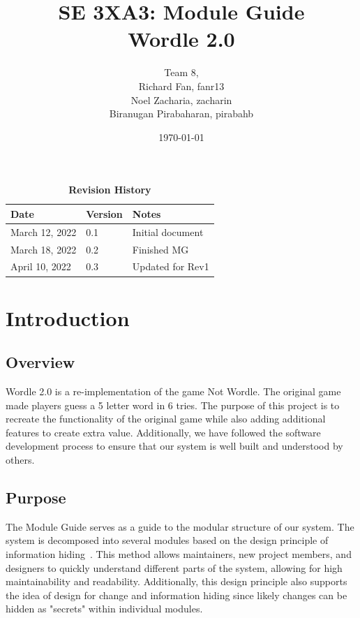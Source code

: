 \documentclass[12pt, titlepage]{article}
\title{SE 3XA3: Module Guide\\ Wordle 2.0}
\author{Team 8,
	\\ Richard Fan, fanr13
	\\ Noel Zacharia, zacharin
	\\ Biranugan Pirabaharan, pirabahb
}
\date{\today}
\begin{document}
	
	\maketitle
	
	\tableofcontents
	\listoftables
	\listoffigures
	
	\begin{table}[bp]
		\caption{\bf Revision History}
		\begin{tabularx}{\textwidth}{p{3cm}p{2cm}X}
			\toprule {\bf Date} & {\bf Version} & {\bf Notes}\\
			\midrule
			March 12, 2022 & 0.1 & Initial document\\
			March 18, 2022 & 0.2 & Finished MG\\
			April 10, 2022 & 0.3 & Updated for Rev1\\
			\bottomrule
		\end{tabularx}
	\end{table}
	
	\newpage
	
	
	\section{Introduction}
	\subsection{Overview}
	Wordle 2.0 is a re-implementation of the game Not Wordle. The original game made players guess a 5 letter word in 6 tries. The purpose of this project is to recreate the functionality of the original game while also adding additional features to create extra value. Additionally, we have followed the software development process to ensure that our system is well built and understood by others. 
	\subsection{Purpose}
	The Module Guide serves as a guide to the modular structure of our system. The system is decomposed into several modules based on the design principle of information hiding~\citep{Parnas1972a}. This method allows maintainers, new project members, and designers to quickly understand different parts of the system, allowing for high maintainability and readability. Additionally, this design principle also supports the idea of design for change and information hiding since likely changes can be hidden as "secrets" within individual modules.
\end{document}
